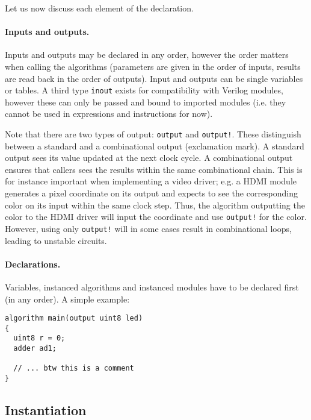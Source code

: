 \documentclass[a4]{article}
\newcommand\verilog{Verilog}
\begin{document}
\noindent Let us now discuss each element of the declaration.


\paragraph{Inputs and outputs.}

Inputs and outputs may be declared in any order, however the order matters when calling the algorithms (parameters are given in the order of inputs, results are read back in the order of outputs). Input and outputs can be single variables or tables.
A third type \texttt{inout} exists for compatibility with \verilog{} modules, however these can only be passed and bound to imported modules (i.e. they cannot be used in expressions and instructions for now).

Note that there are two types of output: \texttt{output} and \texttt{output!}. These distinguish between a standard and a combinational output (exclamation mark). A standard output sees its value updated at the next clock cycle. A combinational output ensures that callers sees the results within the same combinational chain. This is for instance important when implementing a video driver; e.g. a HDMI module generates a pixel coordinate on its output and expects to see the corresponding color on its input within the same clock step. Thus, the algorithm outputting the color to the HDMI driver will input the coordinate and use \texttt{output!} for the color. However, using only \texttt{output!} will in some cases result in combinational loops, leading to unstable circuits.


\paragraph{Declarations.} Variables, instanced algorithms and instanced modules have to be declared first (in any order). A simple example:

\begin{verbatim}
algorithm main(output uint8 led)
{
  uint8 r = 0;
  adder ad1;
  
  // ... btw this is a comment
}
\end{verbatim}


\subsection{Instantiation}
\label{sec:instantiation}
\end{document}
